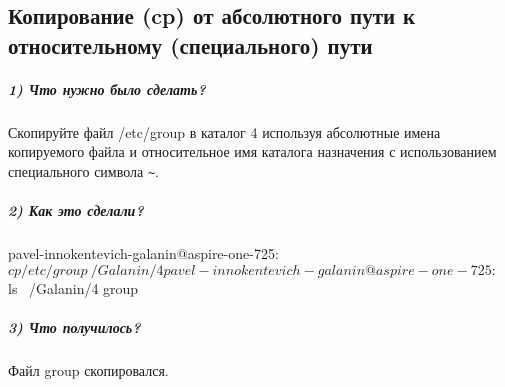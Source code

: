 \subsection{Копирование (cp) от абсолютного пути к относительному (специального) пути}

\subparagraph{1) Что нужно было сделать?}

Скопируйте файл /etc/group в каталог 4 используя абсолютные имена копируемого файла и относительное имя каталога назначения с использованием специального символа \verb|~|.

\subparagraph{2) Как это сделали?}

\begin{MyVerbatimCode}[label=Debian terminal]
pavel-innokentevich-galanin@aspire-one-725:~$ cp /etc/group ~/Galanin/4
pavel-innokentevich-galanin@aspire-one-725:~$ ls ~/Galanin/4
group
\end{MyVerbatimCode}

\subparagraph{3) Что получилось?}

Файл group скопировался.
